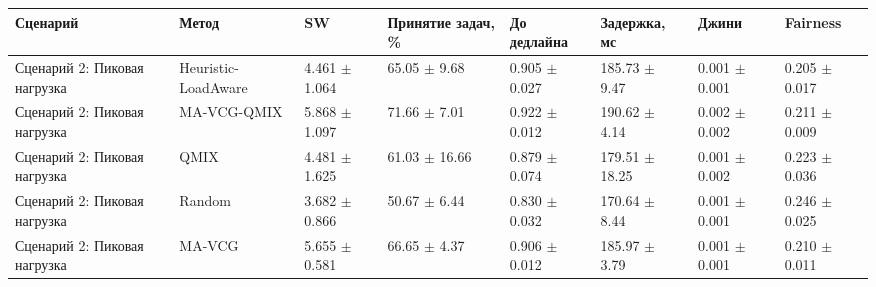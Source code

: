 \begin{tabular}{llllllll}
\toprule
Сценарий & Метод & SW & Принятие задач, \% & До дедлайна & Задержка, мс & Джини & Fairness \\
\midrule
Сценарий 2: Пиковая нагрузка & Heuristic-LoadAware & 4.461 $\pm$ 1.064 & 65.05 $\pm$ 9.68 & 0.905 $\pm$ 0.027 & 185.73 $\pm$ 9.47 & 0.001 $\pm$ 0.001 & 0.205 $\pm$ 0.017 \\
Сценарий 2: Пиковая нагрузка & MA-VCG-QMIX & 5.868 $\pm$ 1.097 & 71.66 $\pm$ 7.01 & 0.922 $\pm$ 0.012 & 190.62 $\pm$ 4.14 & 0.002 $\pm$ 0.002 & 0.211 $\pm$ 0.009 \\
Сценарий 2: Пиковая нагрузка & QMIX & 4.481 $\pm$ 1.625 & 61.03 $\pm$ 16.66 & 0.879 $\pm$ 0.074 & 179.51 $\pm$ 18.25 & 0.001 $\pm$ 0.002 & 0.223 $\pm$ 0.036 \\
Сценарий 2: Пиковая нагрузка & Random & 3.682 $\pm$ 0.866 & 50.67 $\pm$ 6.44 & 0.830 $\pm$ 0.032 & 170.64 $\pm$ 8.44 & 0.001 $\pm$ 0.001 & 0.246 $\pm$ 0.025 \\
Сценарий 2: Пиковая нагрузка & MA-VCG & 5.655 $\pm$ 0.581 & 66.65 $\pm$ 4.37 & 0.906 $\pm$ 0.012 & 185.97 $\pm$ 3.79 & 0.001 $\pm$ 0.001 & 0.210 $\pm$ 0.011 \\
\bottomrule
\end{tabular}
